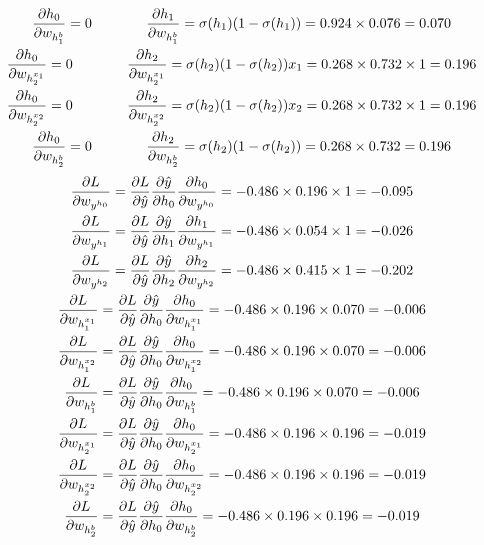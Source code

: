 \documentclass[12pt]{article}
\makeatletter
\newcommand*{\rom}[1]{\expandafter\@slowromancap\romannumeral #1@}
\makeatother
\begin{document}
\begin{qsolve}[Part \rom{2}]
\begin{gather*}
        \pdv{h_0}{w_{h_1^{b}}} = 0 \; \; \; \; \; \; \; \; \; \; \; \; \; \; \pdv{h_1}{w_{h_1^{b}}} = \sigma(h_1) (1 - \sigma(h_1)) = 0.924 \times 0.076 = 0.070 \\
        \pdv{h_0}{w_{h_2^{x_1}}} = 0 \; \; \; \; \; \; \; \; \; \; \; \; \; \; \pdv{h_2}{w_{h_2^{x_1}}} = \sigma(h_2) (1 - \sigma(h_2)) x_1 = 0.268 \times 0.732 \times 1 = 0.196 \\
        \pdv{h_0}{w_{h_2^{x_2}}} = 0 \; \; \; \; \; \; \; \; \; \; \; \; \; \; \pdv{h_2}{w_{h_2^{x_2}}} = \sigma(h_2) (1 - \sigma(h_2)) x_2 = 0.268 \times 0.732 \times 1 = 0.196 \\
        \pdv{h_0}{w_{h_2^{b}}} = 0 \; \; \; \; \; \; \; \; \; \; \; \; \; \; \pdv{h_2}{w_{h_2^{b}}} = \sigma(h_2) (1 - \sigma(h_2)) = 0.268 \times 0.732 = 0.196 \\
    \end{gather*}
    \splitqsolve
    \begin{gather*}
        \pdv{L}{w_{y^{h_0}}} = \pdv{L}{\hat{y}} \pdv{\hat{y}}{h_0} \pdv{h_0}{w_{y^{h_0}}} = -0.486 \times 0.196 \times 1 = -0.095 \\
        \pdv{L}{w_{y^{h_1}}} = \pdv{L}{\hat{y}} \pdv{\hat{y}}{h_1} \pdv{h_1}{w_{y^{h_1}}} = -0.486 \times 0.054 \times 1 = -0.026 \\
        \pdv{L}{w_{y^{h_2}}} = \pdv{L}{\hat{y}} \pdv{\hat{y}}{h_2} \pdv{h_2}{w_{y^{h_2}}} = -0.486 \times 0.415 \times 1 = -0.202 \\
        \pdv{L}{w_{h_1^{x_1}}} = \pdv{L}{\hat{y}} \pdv{\hat{y}}{h_0} \pdv{h_0}{w_{h_1^{x_1}}} = -0.486 \times 0.196 \times 0.070 = -0.006 \\
        \pdv{L}{w_{h_1^{x_2}}} = \pdv{L}{\hat{y}} \pdv{\hat{y}}{h_0} \pdv{h_0}{w_{h_1^{x_2}}} = -0.486 \times 0.196 \times 0.070 = -0.006 \\
        \pdv{L}{w_{h_1^{b}}} = \pdv{L}{\hat{y}} \pdv{\hat{y}}{h_0} \pdv{h_0}{w_{h_1^{b}}} = -0.486 \times 0.196 \times 0.070 = -0.006 \\
        \pdv{L}{w_{h_2^{x_1}}} = \pdv{L}{\hat{y}} \pdv{\hat{y}}{h_0} \pdv{h_0}{w_{h_2^{x_1}}} = -0.486 \times 0.196 \times 0.196 = -0.019 \\
        \pdv{L}{w_{h_2^{x_2}}} = \pdv{L}{\hat{y}} \pdv{\hat{y}}{h_0} \pdv{h_0}{w_{h_2^{x_2}}} = -0.486 \times 0.196 \times 0.196 = -0.019 \\
        \pdv{L}{w_{h_2^{b}}} = \pdv{L}{\hat{y}} \pdv{\hat{y}}{h_0} \pdv{h_0}{w_{h_2^{b}}} = -0.486 \times 0.196 \times 0.196 = -0.019 \\
    \end{gather*}
\end{qsolve}
\end{document}
